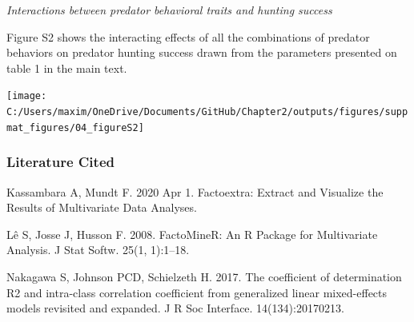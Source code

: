 \documentclass[
  11pt,
]{article}
\let\origfigure\figure
\let\endorigfigure\endfigure
\renewenvironment{figure}[1][2] {
    \expandafter\origfigure\expandafter[H]
} {
    \endorigfigure
}
\newenvironment{cslreferences}%
  {}%
  {\par}
\begin{document}
\begin{center}
\emph{Interactions between predator behavioral traits and hunting success}
\end{center}

Figure S2 shows the interacting effects of all the combinations of
predator behaviors on predator hunting success drawn from the parameters
presented on table 1 in the main text.

\begin{figure}
\texttt{[image: C:/Users/maxim/OneDrive/Documents/GitHub/Chapter2/outputs/figures/suppmat\_figures/04\_figureS2]} \caption{Interacting effects of the predator behaviors on hunting success. Hunting success is represented by the color gradient. We computed the plots by predicting the mean probability of capturing four prey based on the best quadratic approximation of the predator behavior interaction terms. (A) Travel speed and the rate of space covered. (B) Travel speed and the time spent guarding prey. (C) Time before the first capture and travel speed. (D) The rate of space covered and the time spent guarding. (E) The rate of space covered and the time before the first capture. (F) The time spent guarding prey and the time before the first capture.}\label{fig:Figure 2}
\end{figure}

\hypertarget{literature-cited}{%
\subsubsection{Literature Cited}\label{literature-cited}}

\hypertarget{refs}{}
\begin{cslreferences}
\leavevmode\hypertarget{ref-Kassambara.Mundt2020}{}%
Kassambara A, Mundt F. 2020 Apr 1. Factoextra: Extract and Visualize the
Results of Multivariate Data Analyses.

\leavevmode\hypertarget{ref-Le.etal2008}{}%
Lê S, Josse J, Husson F. 2008. FactoMineR: An R Package for Multivariate
Analysis. J Stat Softw. 25(1, 1):1--18.

\leavevmode\hypertarget{ref-nakagawaCoefficientDeterminationR22017}{}%
Nakagawa S, Johnson PCD, Schielzeth H. 2017. The coefficient of
determination R2 and intra-class correlation coefficient from
generalized linear mixed-effects models revisited and expanded. J R Soc
Interface. 14(134):20170213.
\end{cslreferences}
\end{document}
